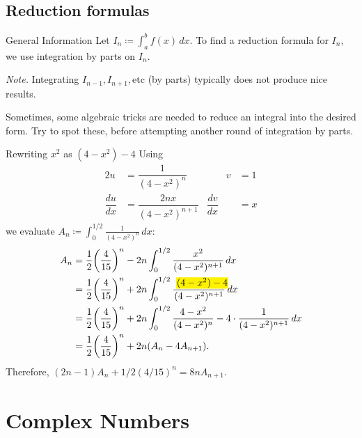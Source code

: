 \documentclass[oneside]{book}
\newcommand{\highlight}[2][red!50]{\mathpalette{\highlightwithstyle[#1]}{#2}}
\newcommand{\highlightwithstyle}[3][red!50]{
  \begingroup                         %
    \sbox0{$\mathsurround 0pt #2#3$}%
    \setlength{\fboxsep}{.5pt}        %
    \sbox2{\hspace{-.5pt}%
      \colorbox{#1}{\usebox0}%
    }%
    \dp2=\dp0 \ht2=\ht0 \wd2=\wd0     %
    \box2                             %
  \endgroup                           %
}
\begin{document}
\section{Reduction formulas}
\begin{stbox}{General Information}{}
  Let \(I_n\coloneq\int_{a}^{b}f(x)\,dx\). To find a reduction formula for \(I_n\), we use integration by parts on \(I_n\).

  \emph{Note.} Integrating \(I_{n-1},I_{n+1},\text{etc}\) (by parts) typically does not produce nice results.  
\end{stbox}
Sometimes, some algebraic tricks are needed to reduce an integral into the desired form. Try to spot these, before attempting another round of integration by parts. 
\begin{example}{Rewriting \(x^2\) as \((4-x^2)-4\)}{}
  Using
   \begin{alignat*}{2}
    u&=\dfrac{1}{(4-x^2)^n} &\qquad  v&=1\\
    \dfrac{du}{dx} &=\dfrac{2nx}{(4-x^2)^{n+1}} & \dfrac{dv}{dx}&=x
   \end{alignat*}
   we evaluate \(A_n\coloneq\int_{0}^{1/2}\frac{1}{(4-x^2)^n}\,dx\):
{\allowdisplaybreaks
     \begin{align*}
    A_n&=\frac{1}{2}{\left( \frac{4}{15} \right)^n}-2n\int_{0}^{1/2}\frac{x^2}{(4-x^2)^{n+1}}\,dx\\
    &=\frac{1}{2}{\left( \frac{4}{15} \right)^n}+2n\int_{0}^{1/2}\frac{\highlight[yellow]{(4-x^2)-4}}{(4-x^2)^{n+1}}\,dx\\
    &=\frac{1}{2}{\left( \frac{4}{15} \right)^n}+2n\int_{0}^{1/2}\frac{4-x^2}{(4-x^2)^n}-4\cdot\frac{1}{(4-x^2)^{n+1}}\,dx\\
    &=\frac{1}{2}{\left( \frac{4}{15} \right)^n}+2n(A_n-4A_{n+1}).\\
   \end{align*}}
   Therefore, \((2n-1)A_n+1/2(4/15)^n=8nA_{n+1}\).
\end{example}
  \chapter{Complex Numbers}
\end{document}
